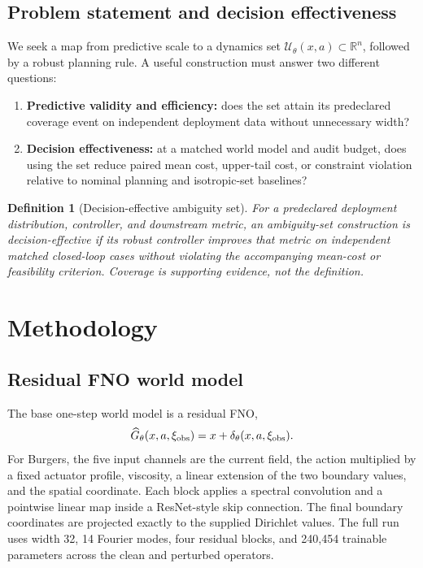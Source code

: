 \documentclass[10pt]{article}
\newtheorem{definition}{Definition}
\newcommand{\R}{\mathbb R}
\newcommand{\U}{\mathcal U}
\begin{document}
\subsection{Problem statement and decision effectiveness}

We seek a map from predictive scale to a dynamics set
$\U_\theta(x,a)\subset\R^n$, followed by a robust planning rule. A useful
construction must answer two different questions:
\begin{enumerate}[label=(P\arabic*)]
\item \textbf{Predictive validity and efficiency:} does the set attain its
predeclared coverage event on independent deployment data without unnecessary
width?
\item \textbf{Decision effectiveness:} at a matched world model and audit
budget, does using the set reduce paired mean cost, upper-tail cost, or
constraint violation relative to nominal planning and isotropic-set baselines?
\end{enumerate}

\begin{definition}[Decision-effective ambiguity set]
For a predeclared deployment distribution, controller, and downstream metric,
an ambiguity-set construction is decision-effective if its robust controller
improves that metric on independent matched closed-loop cases without violating
the accompanying mean-cost or feasibility criterion. Coverage is supporting
evidence, not the definition.
\end{definition}

\section{Methodology}

\subsection{Residual FNO world model}

The base one-step world model is a residual FNO,
\begin{equation}
\widehat G_\theta(x,a,\xi_{\rm obs})
=x+\delta_\theta(x,a,\xi_{\rm obs}).
\label{eq:residual-fno}
\end{equation}
For Burgers, the five input channels are the current field, the action
multiplied by a fixed actuator profile, viscosity, a linear extension of the
two boundary values, and the spatial coordinate. Each block applies a spectral
convolution and a pointwise linear map inside a ResNet-style skip connection.
The final boundary coordinates are projected exactly to the supplied Dirichlet
values. The full run uses width 32, 14 Fourier modes, four residual blocks, and
240,454 trainable parameters across the clean and perturbed operators.
\end{document}
